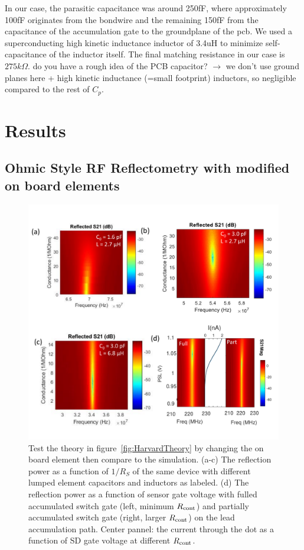 \documentclass[]{article}
\begin{document}
	In our case, the parasitic capacitance was around 250fF, where approximately 100fF originates from the bondwire and the remaining 150fF from the capacitance of the accumulation gate to the groundplane of the pcb. We used a superconducting high kinetic inductance inductor of 3.4uH to minimize self-capacitance of the inductor itself. The final matching resistance in our case is $275k\Omega$.  \color{red}do you have a rough idea of the PCB capacitor? \color{blue} $\rightarrow$ we don't use ground planes here + high kinetic inductance (=small footprint) inductors, so negligible compared to the rest of $C_p$.\color{black}

\section{Results} %
\label{sec:results}
\subsection{Ohmic Style RF Reflectometry with modified on board elements} %
	\label{sub:ohmic_style_rf_reflectometry_with_modified_on_board_elements}



\begin{figure}
	\includegraphics[width = \columnwidth]{Illustrations/HarvardFigure3_v5.pdf}
	\caption{Test the theory in figure\ \ref{fig:HarvardTheory} by changing the on board element then compare to the simulation.			
	(a-c) The reflection power as a function of $1/R_S$ of the same device with different lumped element capacitors and inductors as labeled. 		
	(d) The reflection power as a function of sensor gate voltage with fulled accumulated switch gate (left, minimum $R_{\rm cont}$) and partially accumulated switch gate (right, larger $R_{\rm cont}$) on the lead accumulation path. Center pannel: the current through the dot as a function of SD gate voltage at different $R_{\rm cont}$.}
	\label{fig:Harvardresult}
\end{figure}
\end{document}
